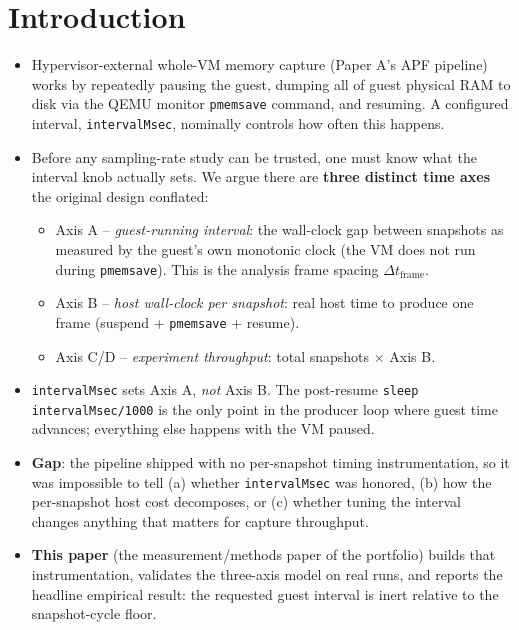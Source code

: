 \documentclass[conference]{IEEEtran}
\begin{document}
\section{Introduction}
\begin{itemize}
  \item Hypervisor-external whole-VM memory capture (Paper A's APF pipeline)
        works by repeatedly pausing the guest, dumping all of guest physical
        RAM to disk via the QEMU monitor \texttt{pmemsave} command, and
        resuming. A configured interval, \texttt{intervalMsec}, nominally
        controls how often this happens.
  \item Before any sampling-rate study can be trusted, one must know what the
        interval knob actually sets. We argue there are \textbf{three distinct
        time axes} the original design conflated:
    \begin{itemize}
      \item Axis A -- \emph{guest-running interval}: the wall-clock gap between
            snapshots as measured by the guest's own monotonic clock (the VM
            does not run during \texttt{pmemsave}). This is the analysis frame
            spacing $\Delta t_{\mathrm{frame}}$.
      \item Axis B -- \emph{host wall-clock per snapshot}: real host time to
            produce one frame (suspend + \texttt{pmemsave} + resume).
      \item Axis C/D -- \emph{experiment throughput}: total snapshots
            $\times$ Axis B.
    \end{itemize}
  \item \texttt{intervalMsec} sets Axis A, \emph{not} Axis B. The post-resume
        \texttt{sleep intervalMsec/1000} is the only point in the producer
        loop where guest time advances; everything else happens with the VM
        paused.
  \item \textbf{Gap}: the pipeline shipped with no per-snapshot timing
        instrumentation, so it was impossible to tell (a) whether
        \texttt{intervalMsec} was honored, (b) how the per-snapshot host cost
        decomposes, or (c) whether tuning the interval changes anything that
        matters for capture throughput.
  \item \textbf{This paper} (the measurement/methods paper of the portfolio)
        builds that instrumentation, validates the three-axis model on real
        runs, and reports the headline empirical result: the requested guest
        interval is inert relative to the snapshot-cycle floor.

\end{itemize}
\end{document}
